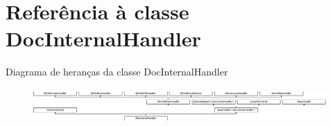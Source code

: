 \hypertarget{class_doc_internal_handler}{\section{Referência à classe Doc\-Internal\-Handler}
\label{class_doc_internal_handler}
}
Diagrama de heranças da classe Doc\-Internal\-Handler\begin{figure}[H]
\begin{center}
\leavevmode
\includegraphics[height=1.322314cm]{class_doc_internal_handler}
\end{center}
\end{figure}
